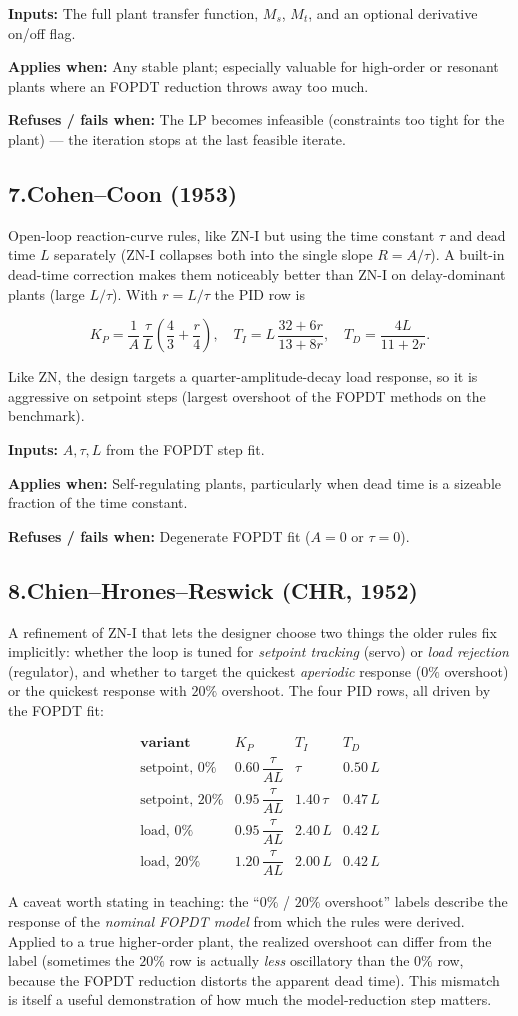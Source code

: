 \documentclass[11pt]{article}
\newcommand{\keybox}[1]{%
  \par\vspace{0.4em}%
  \noindent\colorbox{boxbg}{%
    \begin{minipage}{\dimexpr\linewidth-2\fboxsep\relax}%
      \vspace{0.3em}#1\vspace{0.3em}%
    \end{minipage}}%
  \par\vspace{0.4em}%
}
\newcommand{\applies}[1]{\smallskip\noindent\textbf{Applies when:} #1\par}
\newcommand{\refuses}[1]{\noindent\textbf{Refuses / fails when:} #1\par}
\newcommand{\inputs}[1]{\noindent\textbf{Inputs:} #1\par}
\begin{document}
\inputs{The full plant transfer function, $M_s$, $M_t$, and an optional
derivative on/off flag.}
\applies{Any stable plant; especially valuable for high-order or
resonant plants where an FOPDT reduction throws away too much.}
\refuses{The LP becomes infeasible (constraints too tight for the plant) ---
the iteration stops at the last feasible iterate.}

\subsection{7.\quad Cohen--Coon (1953)}

Open-loop reaction-curve rules, like ZN-I but using the time constant $\tau$
and dead time $L$ separately (ZN-I collapses both into the single slope
$R = A/\tau$). A built-in dead-time correction makes them noticeably better
than ZN-I on delay-dominant plants (large $L/\tau$). With $r = L/\tau$ the PID
row is
\keybox{\[
  K_P = \frac{1}{A}\,\frac{\tau}{L}\!\left(\frac{4}{3} + \frac{r}{4}\right),
  \quad
  T_I = L\,\frac{32 + 6r}{13 + 8r},
  \quad
  T_D = \frac{4L}{11 + 2r}.
\]}
Like ZN, the design targets a quarter-amplitude-decay load response, so it is
aggressive on setpoint steps (largest overshoot of the FOPDT methods on the
benchmark).

\inputs{$A,\tau,L$ from the FOPDT step fit.}
\applies{Self-regulating plants, particularly when dead time is a sizeable
fraction of the time constant.}
\refuses{Degenerate FOPDT fit ($A=0$ or $\tau=0$).}

\subsection{8.\quad Chien--Hrones--Reswick (CHR, 1952)}

A refinement of ZN-I that lets the designer choose two things the older rules
fix implicitly: whether the loop is tuned for \emph{setpoint tracking} (servo)
or \emph{load rejection} (regulator), and whether to target the quickest
\emph{aperiodic} response ($0\%$ overshoot) or the quickest response with
$20\%$ overshoot. The four PID rows, all driven by the FOPDT fit:
\keybox{\[
\renewcommand{\arraystretch}{1.4}
\begin{array}{l|ccc}
\textbf{variant} & K_P & T_I & T_D \\ \hline
\text{setpoint, } 0\%  & 0.60\,\dfrac{\tau}{AL} & \tau       & 0.50\,L \\
\text{setpoint, } 20\% & 0.95\,\dfrac{\tau}{AL} & 1.40\,\tau & 0.47\,L \\
\text{load, } 0\%      & 0.95\,\dfrac{\tau}{AL} & 2.40\,L    & 0.42\,L \\
\text{load, } 20\%     & 1.20\,\dfrac{\tau}{AL} & 2.00\,L    & 0.42\,L
\end{array}
\]}
A caveat worth stating in teaching: the ``$0\%$ / $20\%$ overshoot'' labels
describe the response of the \emph{nominal FOPDT model} from which the rules
were derived. Applied to a true higher-order plant, the realized overshoot can
differ from the label (sometimes the $20\%$ row is actually \emph{less}
oscillatory than the $0\%$ row, because the FOPDT reduction distorts the
apparent dead time). This mismatch is itself a useful demonstration of how
much the model-reduction step matters.
\end{document}
